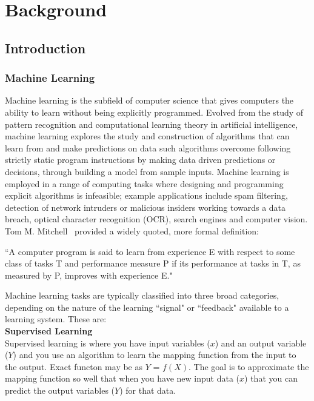 \chapter{Background}\label{background}

\section{Introduction}
\subsection{Machine Learning}
Machine learning is the subfield of computer science that gives computers the ability to learn
without being explicitly programmed. Evolved from the study of pattern recognition and computational
learning theory in artificial intelligence, machine learning explores the study and
construction of algorithms that can learn from and make predictions on data such algorithms
overcome following strictly static program instructions by making data driven predictions or
decisions, through building a model from sample inputs. Machine learning is employed in a
range of computing tasks where designing and programming explicit algorithms is infeasible;
example applications include spam filtering, detection of network intruders or malicious insiders
working towards a data breach, optical character recognition (OCR), search engines and
computer vision.\\

Tom M. Mitchell~\cite{Michalski2013ml} provided a widely quoted, more formal definition:

``A computer program is said to learn from experience E with respect to some class
of tasks T and performance measure P if its performance at tasks in T, as measured
by P, improves with experience E."

Machine learning tasks are typically classified into three broad categories, depending on the
nature of the learning ``signal" or ``feedback" available to a learning system. These are:\\

\textbf{Supervised Learning}\\
Supervised learning is where you have input variables ($x$) and an output variable ($Y$) and
you use an algorithm to learn the mapping function from the input to the output. Exact functon
may be as $Y$ = $f(X)$. The goal is to approximate the mapping function so well that when you
have new input data ($x$) that you can predict the output variables ($Y$) for that data.

